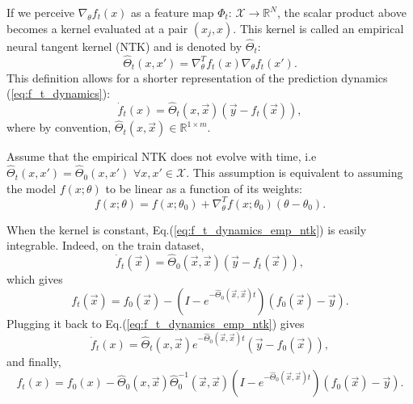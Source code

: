 \documentclass{article}
\newcommand{\XX}{\mathcal{X}}
\newcommand{\RR}{\mathbb{R}}
\begin{document}
    If we perceive $\nabla_\theta f_t(x)$ as a feature map $\Phi_t: \, \XX \to \RR^N$, the scalar product above becomes a kernel evaluated at a pair $(x_j,x)$.
    This kernel is called an empirical neural tangent kernel (NTK) and is denoted by $\hat\Theta_t$:
    \begin{equation}
        \hat\Theta_t(x,x')
        = \nabla_\theta^T f_t(x) \nabla_\theta f_t(x').
    \end{equation}
    This definition allows for a shorter representation of the prediction dynamics (\ref{eq:f_t_dynamics}):
    \begin{equation}
        \dot f_t(x)
        = \hat\Theta_t(x,\vec x) (\vec y - f_t(\vec x)),
        \label{eq:f_t_dynamics_emp_ntk}
    \end{equation}
    where by convention, $\hat\Theta_t(x,\vec x) \in \RR^{1 \times m}$.

    Assume that the empirical NTK does not evolve with time, i.e $\hat\Theta_t(x,x') = \hat\Theta_0(x,x')$ $\forall x,x' \in \XX$.
    This assumption is equivalent to assuming the model $f(x;\theta)$ to be linear as a function of its weights:
    \begin{equation}
        f(x; \theta)
        = f(x; \theta_0) + \nabla_\theta^T f(x; \theta_0) (\theta - \theta_0).
    \end{equation}

    When the kernel is constant, Eq.(\ref{eq:f_t_dynamics_emp_ntk}) is easily integrable.
    Indeed, on the train dataset,
    \begin{equation}
        \dot f_t(\vec x)
        = \hat\Theta_0(\vec x,\vec x) (\vec y - f_t(\vec x)),
        \label{eq:f_t_dynamics_train}
    \end{equation}
    which gives
    \begin{equation}
        f_t(\vec x)
        = f_0(\vec x) - \left(I - e^{-\hat\Theta_0(\vec x, \vec x) t}\right) (f_0(\vec x) - \vec y).
    \end{equation}
    Plugging it back to Eq.(\ref{eq:f_t_dynamics_emp_ntk}) gives
    \begin{equation}
        \dot f_t(x)
        = \hat\Theta_t(x,\vec x) e^{-\hat\Theta_0(\vec x, \vec x) t} (\vec y - f_0(\vec x)),
    \end{equation}
    and finally,
    \begin{equation}
        f_t(x) 
        = f_0(x) - \hat\Theta_0(x, \vec x) \hat\Theta_0^{-1}(\vec x, \vec x) \left(I - e^{-\hat\Theta_0(\vec x, \vec x) t}\right) (f_0(\vec x) - \vec y).
        \label{eq:lin_solution_square_loss}
    \end{equation}
\end{document}
